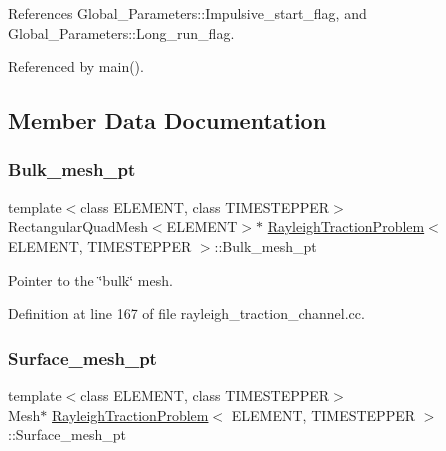 References Global\+\_\+\+Parameters\+::\+Impulsive\+\_\+start\+\_\+flag, and Global\+\_\+\+Parameters\+::\+Long\+\_\+run\+\_\+flag.



Referenced by main().



\subsection{Member Data Documentation}
\mbox{\label{classRayleighTractionProblem_a21664c5b87a5ae008842a150539496ad}} 
\subsubsection{\texorpdfstring{Bulk\+\_\+mesh\+\_\+pt}{Bulk\_mesh\_pt}}
{\footnotesize\ttfamily template$<$class E\+L\+E\+M\+E\+NT, class T\+I\+M\+E\+S\+T\+E\+P\+P\+ER$>$ \\
Rectangular\+Quad\+Mesh$<$E\+L\+E\+M\+E\+NT$>$$\ast$ \hyperlink{classRayleighTractionProblem}{Rayleigh\+Traction\+Problem}$<$ E\+L\+E\+M\+E\+NT, T\+I\+M\+E\+S\+T\+E\+P\+P\+ER $>$\+::Bulk\+\_\+mesh\+\_\+pt\hspace{0.3cm}{\ttfamily [private]}}



Pointer to the \char`\"{}bulk\char`\"{} mesh. 



Definition at line 167 of file rayleigh\+\_\+traction\+\_\+channel.\+cc.

\mbox{\label{classRayleighTractionProblem_ac47f90966608b8797074f5a3fb9ff40a}} 
\subsubsection{\texorpdfstring{Surface\+\_\+mesh\+\_\+pt}{Surface\_mesh\_pt}}
{\footnotesize\ttfamily template$<$class E\+L\+E\+M\+E\+NT, class T\+I\+M\+E\+S\+T\+E\+P\+P\+ER$>$ \\
Mesh$\ast$ \hyperlink{classRayleighTractionProblem}{Rayleigh\+Traction\+Problem}$<$ E\+L\+E\+M\+E\+NT, T\+I\+M\+E\+S\+T\+E\+P\+P\+ER $>$\+::Surface\+\_\+mesh\+\_\+pt\hspace{0.3cm}{\ttfamily [private]}}



